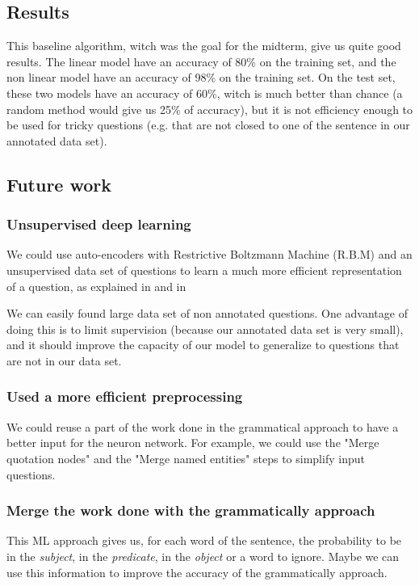 \subsection{Results}

This baseline algorithm, witch was the goal for the midterm, give us quite good results.
The linear model have an accuracy of 80\% on the training set, and the non linear model have an accuracy of 98\% on the training set.
On the test set, these two models have an accuracy of 60\%, witch is much better than chance (a random method would give us 25\% of accuracy), but it is not efficiency enough to be used for tricky questions (e.g. that are not closed to one of the sentence in our annotated data set).

\subsection{Future work}

\subsubsection{Unsupervised deep learning}

We could use auto-encoders  with Restrictive Boltzmann Machine (R.B.M) and an unsupervised data set of questions to learn a much more efficient representation of a question, as explained in \cite{fischer2012introduction} and in \cite{hinton2006reducing}

We can easily found large data set of non annotated questions.
One advantage of doing this is to limit supervision (because our annotated data set is very small), and it should improve the capacity of our model to generalize to questions that are not in our data set.

\subsubsection{Used a more efficient preprocessing}

We could reuse a part of the work done in the grammatical approach to have a better input for the neuron network. For example, we could use the "Merge quotation nodes" and the "Merge named entities" steps to simplify input questions.

\subsubsection{Merge the work done with the grammatically approach}

This ML approach gives us, for each word of the sentence, the probability to be in the \textit{subject}, in the \textit{predicate}, in the \textit{object} or a word to ignore.
Maybe we can use this information to improve the accuracy of the grammatically approach.


